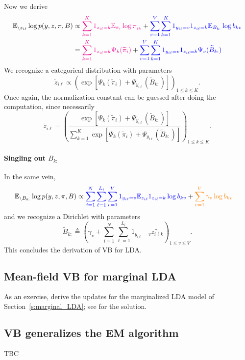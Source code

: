 Now we derive
\begin{align*}
  \mathbb{E}_{\setminus z_{i\ell}} \log p(y,z,\pi, B)
    &\propto  \textcolor{magenta}{\sum_{k=1}^K  1_{z_{i\ell}=k} \mathbb{E}_{\pi_i}\log\pi_{_{ik}}}
    + \textcolor{blue}{\sum_{v=1}^V \sum_{k=1}^K 1_{y_{i\ell}=v} 1_{z_{i\ell}=k} \mathbb{E}_{B_{k:}}\log b_{kv} }\\
    &=  \textcolor{magenta}{\sum_{k=1}^K  1_{z_{i\ell}=k} \Psi_k(\widetilde\pi_{i})}
    + \textcolor{blue}{\sum_{v=1}^V \sum_{k=1}^K 1_{y_{i\ell}=v} 1_{z_{i\ell}=k} \Psi_v(\widetilde{B}_{k:}) }
\end{align*}
We recognize a categorical distribution with parameters
$$
\widetilde{z}_{i\ell} \propto \left( \exp\left[\Psi_k(\widetilde\pi_{i}) +  \Psi_{y_{i\ell}}(\widetilde{B}_{k:})\right]\right)_{1\leq k \leq K}.
$$
Once again, the normalization constant can be guessed after doing the computation, since necessarily
$$
  \widetilde{z}_{i\ell} =
    \left(
      \frac{\exp\left[\Psi_k(\widetilde\pi_{i}) +  \Psi_{y_{i\ell}}(\widetilde{B}_{k:})\right]}
      {\sum_{k=1}^K \exp\left[\Psi_k(\widetilde\pi_{i}) +  \Psi_{y_{i\ell}}(\widetilde{B}_{k:})\right]}
    \right)_{1\leq k \leq K}.
$$

\paragraph{Singling out $B_{k:}$}
In the same vein,
\begin{align*}
  \mathbb{E}_{\setminus B_{k:}} \log p(y,z,\pi, B)
    &\propto \textcolor{blue}{\sum_{i=1}^N\sum_{\ell=1}^{L_i}\sum_{v=1}^V 1_{y_{i\ell}=v} \mathbb{E}_{z_{i\ell}} 1_{z_{i\ell}=k} \log b_{kv} } + \textcolor{orange}{\sum_{v=1}^V \gamma_v\log b_{kv}}
\end{align*}
and we recognize a Dirichlet with parameters
$$
\widetilde{B}_{k:} \triangleq \left (\gamma_v + \sum_{i=1}^N\sum_{\ell=1}^{L_i} 1_{y_{i\ell}=v}\widetilde{z_{i\ell k}} \right)_{1\leq v \leq V}.
$$
This concludes the derivation of VB for LDA.

\subsection{Mean-field VB for marginal LDA}
As an exercise, derive the updates for the marginalized LDA model of Section~\ref{s:marginal_LDA}; see \cite[Chapter 27.3]{Mur12} for the solution.

\subsection{VB generalizes the EM algorithm}
TBC

